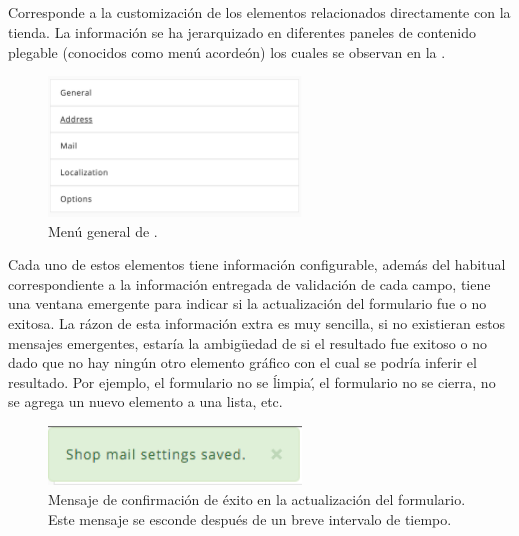 \subsection{\ecomFrameworkCoreEF}

Corresponde a la customización de los elementos relacionados directamente con la tienda. La información se ha jerarquizado en diferentes paneles de contenido plegable (conocidos como menú acordeón) los cuales se observan en la .
\begin{figure}[H]
	\centering
	\includegraphics[width=0.6\textwidth]{figuras/dashboard/ecommerce/main_menu.png}
	\caption{Menú general de \ecomFrameworkCoreEF.}
	\label{figure:dashboard:ecommerce:main_menu}
\end{figure}

Cada uno de estos elementos tiene información configurable, además del \feedback habitual correspondiente a la información entregada de validación de cada campo, tiene una ventana emergente para indicar si la actualización del formulario fue o no exitosa.
La rázon de esta información extra es muy sencilla, si no existieran estos mensajes emergentes, estaría la ambigüedad de si el resultado fue exitoso o no dado que no hay ningún otro elemento gráfico con el cual se podría inferir el resultado. Por ejemplo, el formulario no se \'limpia\', el formulario no se cierra, no se agrega un nuevo elemento a una lista, etc.

\begin{figure}[H]
	\centering
	\includegraphics[width=0.6\textwidth]{figuras/dashboard/ecommerce/success_message.png}
	\caption{Mensaje de confirmación de éxito en la actualización del formulario. Este mensaje se esconde después de un breve intervalo de tiempo.}
	\label{figure:dashboard:ecommerce:success_message}
\end{figure}

